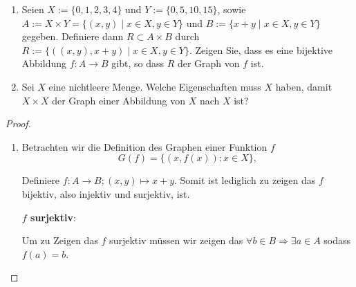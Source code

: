 \documentclass{../problemset}
\begin{document}
\begin{problem}[Graphen]
\begin{enumerate}
	\item Seien $X := \{0, 1, 2, 3, 4\}$ und $Y := \{0, 5, 10, 15\}$, sowie $A := X \times Y = \{(x, y) \mid x \in X, y \in Y\}$ und $B := \{x + y \mid x \in X, y \in Y\}$ gegeben. Definiere dann $R \subset A \times B$ durch $R := \{((x, y), x + y) \mid x \in X, y \in Y\}$.
	      Zeigen Sie, dass es eine bijektive Abbildung $f : A \to B$ gibt, so dass $R$ der Graph von $f$ ist.

	\item Sei $X$ eine nichtleere Menge. Welche Eigenschaften muss $X$ haben, damit $X \times X$ der Graph einer Abbildung von $X$ nach $X$ ist?

\end{enumerate}

\begin{proof}

	\begin{enumerate}
		\item Betrachten wir die Definition des Graphen einer Funktion $f$ \[
			      G(f) = \{(x,f(x)) : x \in X\},
		      \]

		      Definiere $f : A \rightarrow B; (x, y) \mapsto x + y$.
		      Somit ist lediglich zu zeigen das $f$ bijektiv, also injektiv und surjektiv, ist.

		      \textbf{$f$ surjektiv}:

		      Um zu Zeigen das $f$ surjektiv müssen wir zeigen das $\forall b \in B \Rightarrow \exists a \in A$ sodass $f(a) = b$.


	\end{enumerate}

\end{proof}

\end{problem}

\pagebreak
\end{document}
